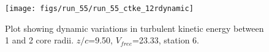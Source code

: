 \begin{figure}[H]
\centering
\texttt{[image: figs/run\_55/run\_55\_ctke\_12rdynamic]}
\caption{Plot showing dynamic variations in turbulent kinetic energy between 1 and 2 core radii. $z/c$=9.50, $V_{free}$=23.33, station 6.}
\label{fig:run_55_ctke_12rdynamic}
\end{figure}


